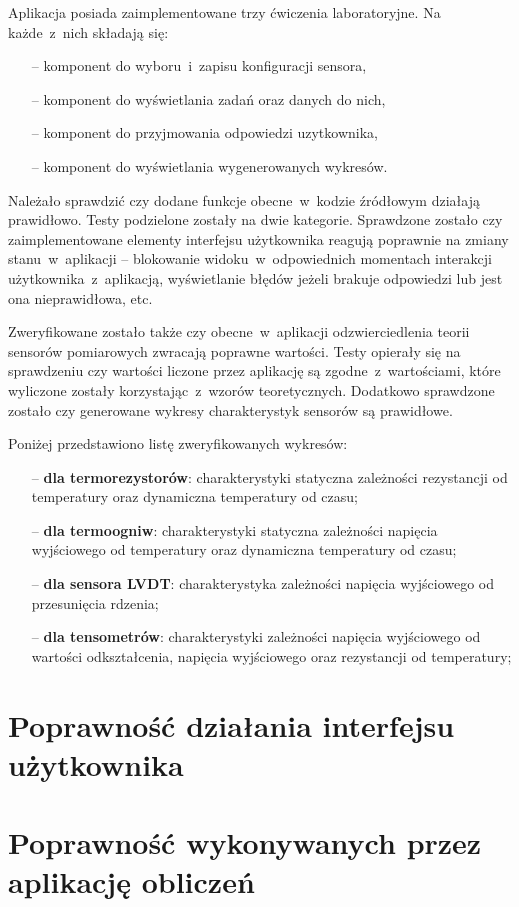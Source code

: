 Aplikacja posiada zaimplementowane trzy ćwiczenia laboratoryjne. Na każde~z~nich składają się:

\begin{itemize}
  \item [--] komponent do wyboru~i~zapisu konfiguracji sensora,
  \item [--] komponent do wyświetlania zadań oraz danych do nich,
  \item [--] komponent do przyjmowania odpowiedzi uzytkownika,
  \item [--] komponent do wyświetlania wygenerowanych wykresów.
\end{itemize}

Należało sprawdzić czy dodane funkcje obecne~w~kodzie źródłowym działają prawidłowo. Testy
podzielone zostały na dwie kategorie. Sprawdzone zostało czy zaimplementowane elementy interfejsu
użytkownika reagują poprawnie na zmiany stanu~w~aplikacji -- blokowanie widoku~w~odpowiednich
momentach interakcji użytkownika~z~aplikacją, wyświetlanie błędów jeżeli brakuje odpowiedzi lub jest
ona nieprawidłowa, etc.

Zweryfikowane zostało także czy obecne~w~aplikacji odzwierciedlenia teorii sensorów pomiarowych
zwracają poprawne wartości. Testy opierały się na sprawdzeniu czy wartości liczone przez aplikację
są zgodne~z~wartościami, które wyliczone zostały korzystając~z~wzorów teoretycznych. Dodatkowo
sprawdzone zostało czy generowane wykresy charakterystyk sensorów są prawidłowe.

\noindent Poniżej przedstawiono listę zweryfikowanych wykresów:

\begin{itemize}
  \item [--] \textbf{dla termorezystorów}: charakterystyki statyczna zależności rezystancji od
        temperatury oraz dynamiczna temperatury od czasu;
  \item [--] \textbf{dla termoogniw}: charakterystyki statyczna zależności napięcia wyjściowego od
        temperatury oraz dynamiczna temperatury od czasu;
  \item [--] \textbf{dla sensora LVDT}: charakterystyka zależności napięcia wyjściowego od
        przesunięcia rdzenia;
  \item [--] \textbf{dla tensometrów}: charakterystyki zależności napięcia wyjściowego od wartości
        odkształcenia, napięcia wyjściowego oraz rezystancji od temperatury;
\end{itemize}

\section{Poprawność działania interfejsu użytkownika}


\section{Poprawność wykonywanych przez aplikację obliczeń}
